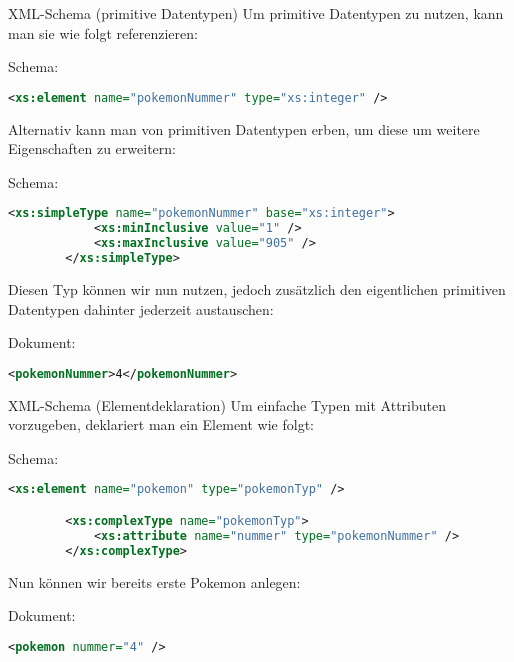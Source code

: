 \begin{example}{XML-Schema (primitive Datentypen)}
    Um primitive Datentypen zu nutzen, kann man sie wie folgt referenzieren:
    
    Schema:
    \begin{lstlisting}[language=XML]
        <xs:element name="pokemonNummer" type="xs:integer" />
    \end{lstlisting}
    
    Alternativ kann man von primitiven Datentypen erben, um diese um weitere Eigenschaften zu erweitern:
    
    Schema:
    \begin{lstlisting}[language=XML]
        <xs:simpleType name="pokemonNummer" base="xs:integer">
            <xs:minInclusive value="1" />
            <xs:maxInclusive value="905" />
        </xs:simpleType>
    \end{lstlisting}
    
    Diesen Typ können wir nun nutzen, jedoch zusätzlich den eigentlichen primitiven Datentypen dahinter jederzeit austauschen:
    
    Dokument:
    \begin{lstlisting}[language=XML]
        <pokemonNummer>4</pokemonNummer>
    \end{lstlisting}
\end{example}

\begin{example}{XML-Schema (Elementdeklaration)}
    Um einfache Typen mit Attributen vorzugeben, deklariert man ein Element wie folgt:
    
    Schema:
    \begin{lstlisting}[language=XML]
        <xs:element name="pokemon" type="pokemonTyp" />

        <xs:complexType name="pokemonTyp">
            <xs:attribute name="nummer" type="pokemonNummer" />
        </xs:complexType>
    \end{lstlisting}
    
    Nun können wir bereits erste Pokemon anlegen:
    
    Dokument:
    \begin{lstlisting}[language=XML]
        <pokemon nummer="4" />
    \end{lstlisting}
\end{example}

